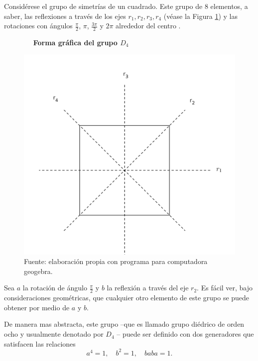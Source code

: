 \begin{ejemplo}[Representación de $D_4$]\label{ejem:diedrico}
Considérese el grupo de simetrías de un cuadrado. Este grupo de 8 elementos, a saber, las reflexiones a través de los ejes $r_1, r_2, r_3, r_4$ (véase la Figura \ref{fig:ejemplo}) y las rotaciones con ángulos $\frac{\pi}{2}$, $\pi$, $\frac{3\pi}{2}$ y $2\pi$ alrededor del centro . 



\begin{figure}[t]
  \centering
  \caption{$\quad $ \textbf{Forma gráfica del grupo $D_4$}}
  	  \includegraphics{cuadrado}
	  \captionsetup[figure]{textfont = normal, labelformat=empty, labelsep=period}
  	  \caption*{\newline Fuente: elaboración propia con programa para computadora geogebra.}
  \label{fig:ejemplo}
\end{figure}
Sea $a$ la rotación de ángulo $\frac{\pi}{2}$ y $b$ la reflexión a través del eje $r_2$. Es fácil ver, bajo consideraciones geométricas, que cualquier otro elemento de este grupo se puede obtener por medio de $a$ y $b$.

De manera mas abstracta, este grupo --que es llamado grupo diédrico de orden ocho y usualmente denotado por $D_4$ -- puede ser definido con dos generadores que satisfacen las relaciones
\begin{equation*}
a^4 = 1, \quad b^2 = 1 , \quad baba = 1.  
\end{equation*}


\end{ejemplo}
